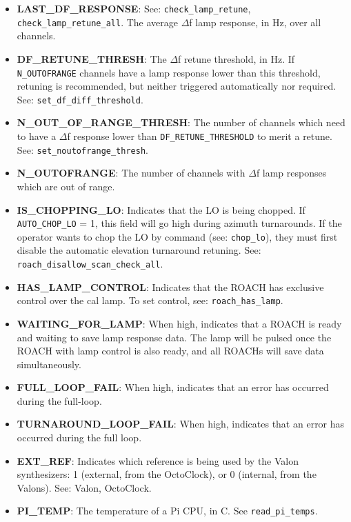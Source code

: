 \begin{itemize}[leftmargin=*,label={}]
\item \textbf{LAST\_DF\_RESPONSE}: See: \texttt{check\_lamp\_retune}, \texttt{check\_lamp\_retune\_all}. The average $\Delta$f lamp response, in Hz, over all channels.

\item \textbf{DF\_RETUNE\_THRESH}: The $\Delta$f retune threshold, in Hz. If \texttt{N\_OUTOFRANGE} channels have a lamp response lower than this threshold, retuning is recommended, but neither triggered automatically nor required. See: \texttt{set\_df\_diff\_threshold}.

\item \textbf{N\_OUT\_OF\_RANGE\_THRESH}: The number of channels which need to have a $\Delta$f response lower than \texttt{DF\_RETUNE\_THRESHOLD} to merit a retune.
See: \texttt{set\_noutofrange\_thresh}.

\item \textbf{N\_OUTOFRANGE}: The number of channels with $\Delta$f lamp responses which are out of range.

\item \textbf{IS\_CHOPPING\_LO}: Indicates that the LO is being chopped. If \texttt{AUTO\_CHOP\_LO} = 1, this field will go high during azimuth turnarounds. If the operator wants to chop the LO by command (see: \texttt{chop\_lo}), they must first disable the automatic elevation turnaround retuning. See: \texttt{roach\_disallow\_scan\_check\_all}.

\item \textbf{HAS\_LAMP\_CONTROL}: Indicates that the ROACH has exclusive control over the cal lamp. To set control, see: \texttt{roach\_has\_lamp}.

\item \textbf{WAITING\_FOR\_LAMP}: When high, indicates that a ROACH is ready and waiting to save lamp response data. The lamp will be pulsed once the ROACH with lamp control is also ready, and all ROACHs will save data simultaneously.

\item \textbf{FULL\_LOOP\_FAIL}: When high, indicates that an error has occurred during the full-loop.

\item \textbf{TURNAROUND\_LOOP\_FAIL}: When high, indicates that an error has occurred during the full loop.

\item \textbf{EXT\_REF}: Indicates which reference is being used by the Valon synthesizers: 1 (external, from the OctoClock), or 0 (internal, from the Valons). See: Valon, OctoClock.

\item \textbf{PI\_TEMP}: The temperature of a Pi CPU, in C. See \texttt{read\_pi\_temps}.

\end{itemize}

